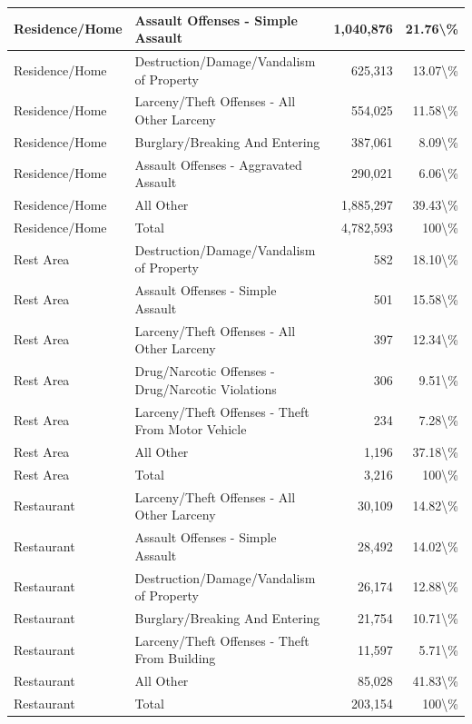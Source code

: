 \documentclass[
]{krantz}
\begin{document}
\begin{longtable}[t]{l|l|r|r}
\hline
Residence/Home & Assault Offenses - Simple Assault & 1,040,876 & 21.76\textbackslash{}\%\\
\hline
Residence/Home & Destruction/Damage/Vandalism of Property & 625,313 & 13.07\textbackslash{}\%\\
\hline
Residence/Home & Larceny/Theft Offenses - All Other Larceny & 554,025 & 11.58\textbackslash{}\%\\
\hline
Residence/Home & Burglary/Breaking And Entering & 387,061 & 8.09\textbackslash{}\%\\
\hline
Residence/Home & Assault Offenses - Aggravated Assault & 290,021 & 6.06\textbackslash{}\%\\
\hline
Residence/Home & All Other & 1,885,297 & 39.43\textbackslash{}\%\\
\hline
Residence/Home & Total & 4,782,593 & 100\textbackslash{}\%\\
\hline
Rest Area & Destruction/Damage/Vandalism of Property & 582 & 18.10\textbackslash{}\%\\
\hline
Rest Area & Assault Offenses - Simple Assault & 501 & 15.58\textbackslash{}\%\\
\hline
Rest Area & Larceny/Theft Offenses - All Other Larceny & 397 & 12.34\textbackslash{}\%\\
\hline
Rest Area & Drug/Narcotic Offenses - Drug/Narcotic Violations & 306 & 9.51\textbackslash{}\%\\
\hline
Rest Area & Larceny/Theft Offenses - Theft From Motor Vehicle & 234 & 7.28\textbackslash{}\%\\
\hline
Rest Area & All Other & 1,196 & 37.18\textbackslash{}\%\\
\hline
Rest Area & Total & 3,216 & 100\textbackslash{}\%\\
\hline
Restaurant & Larceny/Theft Offenses - All Other Larceny & 30,109 & 14.82\textbackslash{}\%\\
\hline
Restaurant & Assault Offenses - Simple Assault & 28,492 & 14.02\textbackslash{}\%\\
\hline
Restaurant & Destruction/Damage/Vandalism of Property & 26,174 & 12.88\textbackslash{}\%\\
\hline
Restaurant & Burglary/Breaking And Entering & 21,754 & 10.71\textbackslash{}\%\\
\hline
Restaurant & Larceny/Theft Offenses - Theft From Building & 11,597 & 5.71\textbackslash{}\%\\
\hline
Restaurant & All Other & 85,028 & 41.83\textbackslash{}\%\\
\hline
Restaurant & Total & 203,154 & 100\textbackslash{}\%\\

\end{longtable}
\end{document}
